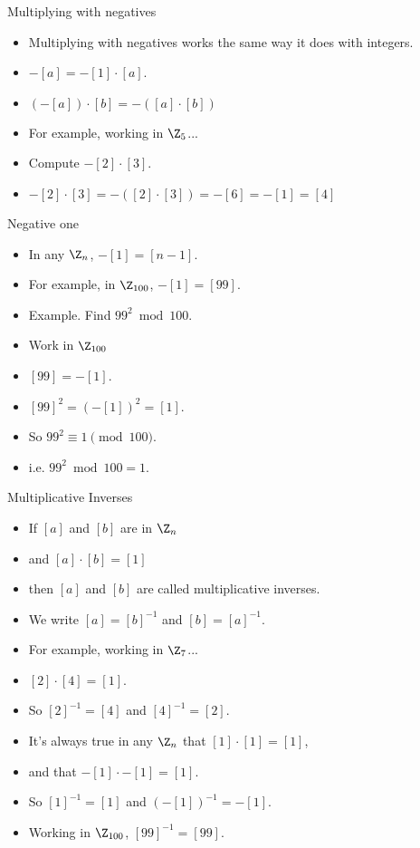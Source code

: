 \documentclass[handout]{beamer}
\begin{document}
\begin{frame}{Multiplying with negatives}
\begin{itemize}
  \item Multiplying with negatives works the same way it does with integers.
  \item $-[a] = -[1] \cdot [a]$.
  \item $(-[a])\cdot [b] = -([a]\cdot [b])$
  \item For example, working in $\Z_5$...
  \item Compute $-[2] \cdot [3]$.
  \item $-[2] \cdot [3] = -([2]\cdot[3]) = -[6] = -[1] = [4]$
\end{itemize}
\end{frame}

\begin{frame}{Negative one}
\begin{itemize}
  \item In any $\Z_n$, $-[1] = [n-1]$.
  \item For example, in $\Z_{100}$, $-[1] = [99]$.
  \item Example. Find $99^2 \bmod 100$.
  \item Work in $\Z_{100}$
  \item $[99] = -[1]$.
  \item $[99]^2 = (-[1])^2 = [1]$.
  \item So $99^2 \equiv 1 \pmod {100}$.
  \item i.e. $99^2 \bmod 100 = 1$.
\end{itemize}
\end{frame}

\begin{frame}{Multiplicative Inverses}
\begin{itemize}
  \item If $[a]$ and $[b]$ are in $\Z_n$
  \item and $[a]\cdot [b] = [1]$
  \item then $[a]$ and $[b]$ are called multiplicative inverses.
  \item We write $[a] = [b]^{-1}$ and $[b] = [a]^{-1}$.
  \item For example, working in $\Z_7$...
  \item $[2]\cdot[4] = [1]$.
  \item So $[2]^{-1} = [4]$ and $[4]^{-1} = [2]$.
  \item It's always true in any $\Z_n$ that $[1]\cdot[1] = [1]$,
  \item and that $-[1]\cdot-[1] = [1]$.
  \item So $[1]^{-1} = [1]$ and $(-[1])^{-1} = -[1]$.
  \item Working in $\Z_{100}$, $[99]^{-1}=[99]$.
\end{itemize}
\end{frame}
\end{document}
